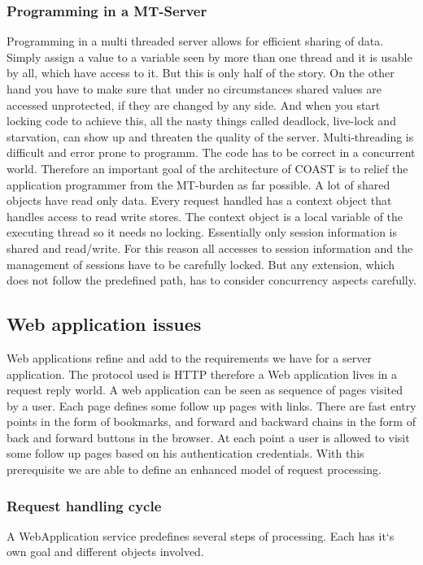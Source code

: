 \subsubsection{Programming in a MT-Server}
Programming in a multi threaded server allows for efficient sharing of data.
Simply assign a value to a variable seen by more than one thread and it is
usable by all, which have access to it. But this is only half of the story. On
the other hand you have to make sure that under no circumstances shared values
are accessed unprotected, if they are changed by any side. And when you start
locking code to achieve this, all the nasty things called deadlock, live-lock
and starvation, can show up and threaten the quality of the server.
Multi-threading is difficult and error prone to programm. The code has to be
correct in a concurrent world. Therefore an important goal of the architecture
of COAST is to relief the application programmer from the MT-burden as far
possible. A lot of shared objects have read only data. Every request handled has
a context object that handles access to read write stores. The context object is
a local variable of the executing thread so it needs no locking. Essentially
only session information is shared and read/write. For this reason all accesses
to session information and the management of sessions have to be carefully
locked. But any extension, which does not follow the predefined path, has to
consider concurrency aspects carefully.

\subsection{Web application issues}
Web applications refine and add to the requirements we have for a server
application. The protocol used is HTTP therefore a Web application lives in a
request reply world. A web application can be seen as sequence of pages visited
by a user. Each page defines some follow up pages with links. There are fast
entry points in the form of bookmarks, and forward and backward chains in the
form of back and forward buttons in the browser. At each point a user is allowed
to visit some follow up pages based on his authentication credentials. With this
prerequisite we are able to define an enhanced model of request processing.

\subsubsection{Request handling cycle}
A WebApplication service predefines several steps of processing. Each has it‘s
own goal and different objects involved.


